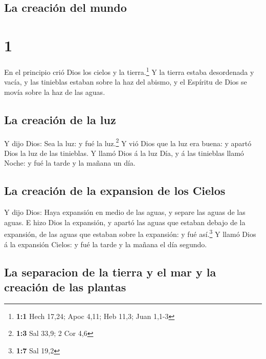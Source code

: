 \hypertarget{la-creaciuxf3n-del-mundo}{%
\subsection{La creación del mundo}\label{la-creaciuxf3n-del-mundo}}

\hypertarget{section}{%
\section{1}\label{section}}

 En el principio crió Dios los cielos y la
tierra.\footnote{\textbf{1:1} Hech 17,24; Apoc 4,11; Heb 11,3; Juan
  1,1-3}  Y la tierra estaba desordenada y vacía, y las
tinieblas estaban sobre la haz del abismo, y el Espíritu de Dios se
movía sobre la haz de las aguas.

\hypertarget{la-creaciuxf3n-de-la-luz}{%
\subsection{La creación de la luz}\label{la-creaciuxf3n-de-la-luz}}

 Y dijo Dios: Sea la luz: y fué la luz.\footnote{\textbf{1:3}
  Sal 33,9; 2 Cor 4,6}  Y vió Dios que la luz era buena: y
apartó Dios la luz de las tinieblas.  Y llamó Dios á la luz
Día, y á las tinieblas llamó Noche: y fué la tarde y la mañana un día.

\hypertarget{la-creaciuxf3n-de-la-expansion-de-los-cielos}{%
\subsection{La creación de la expansion de los
Cielos}\label{la-creaciuxf3n-de-la-expansion-de-los-cielos}}

 Y dijo Dios: Haya expansión en medio de las aguas, y separe
las aguas de las aguas.  E hizo Dios la expansión, y apartó
las aguas que estaban debajo de la expansión, de las aguas que estaban
sobre la expansión: y fué así.\footnote{\textbf{1:7} Sal 19,2}
 Y llamó Dios á la expansión Cielos: y fué la tarde y la
mañana el día segundo.

\hypertarget{la-separacion-de-la-tierra-y-el-mar-y-la-creaciuxf3n-de-las-plantas}{%
\subsection{La separacion de la tierra y el mar y la creación de las
plantas}\label{la-separacion-de-la-tierra-y-el-mar-y-la-creaciuxf3n-de-las-plantas}}

